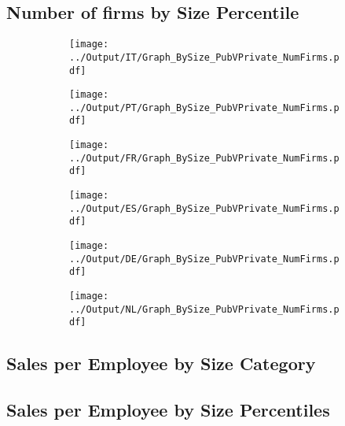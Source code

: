 \documentclass[12pt,notitlepage]{article}
\begin{document}
\subsection{Number of firms by Size Percentile}
\begin{figure}[!htpb]
\centering
\begin{subfigure}{.49\textwidth}
    \centering
 \texttt{[image: ../Output/IT/Graph\_BySize\_PubVPrivate\_NumFirms.pdf]}
\end{subfigure}%
\begin{subfigure}{.49\textwidth}
    \centering
 \texttt{[image: ../Output/PT/Graph\_BySize\_PubVPrivate\_NumFirms.pdf]}
\end{subfigure}
\begin{subfigure}{.49\textwidth}
    \centering
 \texttt{[image: ../Output/FR/Graph\_BySize\_PubVPrivate\_NumFirms.pdf]}
\end{subfigure}%
\begin{subfigure}{.49\textwidth}
    \centering
 \texttt{[image: ../Output/ES/Graph\_BySize\_PubVPrivate\_NumFirms.pdf]}
\end{subfigure}
\begin{subfigure}{.49\textwidth}
    \centering
 \texttt{[image: ../Output/DE/Graph\_BySize\_PubVPrivate\_NumFirms.pdf]}
\end{subfigure}
\begin{subfigure}{.49\textwidth}
    \centering
 \texttt{[image: ../Output/NL/Graph\_BySize\_PubVPrivate\_NumFirms.pdf]}
\end{subfigure}
\end{figure}

\subsection{Sales per Employee by Size Category}
\clearpage
\subsection{Sales per Employee by Size Percentiles}
\clearpage
\end{document}
